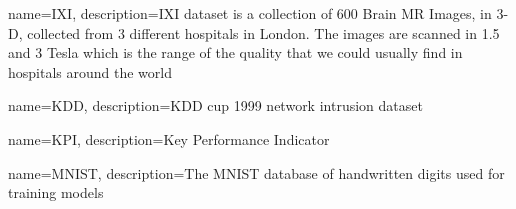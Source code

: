 {
    name=IXI,
    description={IXI dataset is a collection of 600 Brain MR Images, in 3-D, collected from 3 different hospitals in London. The images are scanned in 1.5 and 3 Tesla which is the range of the quality that we could usually find in hospitals around the world}
}

{
    name=KDD,
    description={KDD cup 1999 network intrusion dataset}
}

{
    name=KPI,
    description={Key Performance Indicator}
}

{
    name=MNIST,
    description={The MNIST database of handwritten digits used for training models}
}












